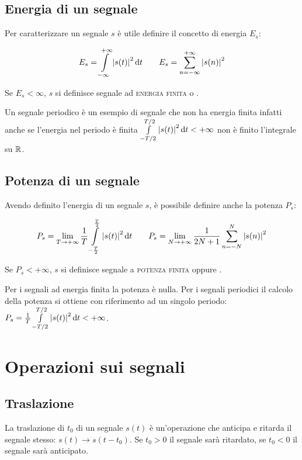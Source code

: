 \subsection{Energia di un segnale}
Per caratterizzare un segnale $s$ è utile definire il concetto di energia $E_s$:

\begin{equation}\label{eq:segnale_energia}
E_s=\int\limits_{-\infty}^{+\infty}{\left|{s(t)}\right|^2}{\,\mathop{}\!\mathrm{d}{t}} \qquad E_s=\sum_{n=-\infty}^{+\infty}\left|{s(n)}\right|^2 
\end{equation}

Se $E_s < \infty$, $s$  si definisce segnale ad \textsc{energia finita} o .

Un segnale periodico è un esempio di segnale che non ha energia finita infatti anche se l'energia nel periodo è finita $\int\limits_{-T/2}^{T/2}{\left|{s(t)}\right|^2}{\,\mathop{}\!\mathrm{d}{t}}<+\infty$ non è finito l'integrale su $\mathbb{R}$.

\subsection{Potenza di un segnale}
Avendo definito l'energia di un segnale $s$, è possibile definire anche la potenza $P_s$: 

\begin{equation}\label{eq:segnale_potenza}
P_s=\lim\limits_{T\to+\infty}{\frac{1}{T}\int\limits_{-\frac{T}{2}}^{\frac{T}{2}}{\left|{s(t)}\right|^2}{\,\mathop{}\!\mathrm{d}{t}}} \qquad 
P_s=\lim\limits_{N\to+\infty}{\frac{1}{2N+1}\sum_{n=-N}^{N}{\left|{s(n)}\right|^2}}
\end{equation}

Se $P_s<+\infty$, $s$ si definisce segnale a \textsc{potenza finita} oppure .

Per i segnali ad energia finita la potenza è nulla. Per i segnali periodici il calcolo della potenza si ottiene con riferimento ad un singolo periodo: $P_s=\frac{1}{T}\int\limits_{-T/2}^{T/2}{\left|{s(t)}\right|^2}{\,\mathop{}\!\mathrm{d}{t}}<+\infty$.

\section{Operazioni sui segnali}
\subsection{Traslazione}
La traslazione di $t_0$ di un segnale $s(t)$ è un'operazione che anticipa e ritarda il segnale stesso: 
$s(t) \to s(t-t_0)$. Se $t_0>0$ il segnale sarà ritardato, se $t_0<0$ il segnale sarà anticipato.
